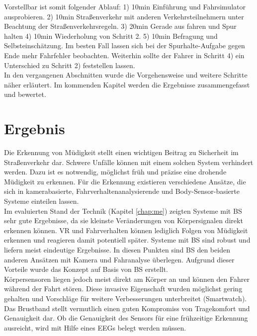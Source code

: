 {Vorstellbar ist somit folgender Ablauf: 1) 10min Einführung und Fahrsimulator ausprobieren. 2) 10min Straßenverkehr mit anderen Verkehrsteilnehmern unter Beachtung der Straßenverkehrsregeln. 3) 20min Gerade aus fahren und Spur halten 4) 10min Wiederholung von Schritt 2. 5) 10min Befragung und Selbsteinschätzung.
Im besten Fall lassen sich bei der Spurhalte-Aufgabe gegen Ende mehr Fahrfehler beobachten. Weiterhin sollte der Fahrer in Schritt 4) ein Unterschied zu Schritt 2) feststellen lassen.\\

In den vergangenen Abschnitten wurde die Vorgehensweise und weitere Schritte näher erläutert. Im kommenden Kapitel werden die Ergebnisse zusammengefasst und bewertet.


\section{Ergebnis}
\label{chap:result}
Die Erkennung von Müdigkeit stellt einen wichtigen Beitrag zu Sicherheit im Straßenverkehr dar. Schwere Unfälle können mit einem solchen System verhindert werden. Dazu ist es notwendig, möglichst früh und präzise eine drohende Müdigkeit zu erkennen. Für die Erkennung existieren verschiedene Ansätze, die sich in kamerabasierte, Fahrverhaltenanalysierende und Body-Sensor-basierte Systeme einteilen lassen. \\

Im evaluierten Stand der Technik (Kapitel \ref{chap:me}) zeigten Systeme mit \acl{BS}  sehr gute Ergebnisse, da sie kleinste Veränderungen von Körpersignalen direkt erkennen können. VR und Fahrverhalten können lediglich Folgen von Müdigkeit erkennen und reagieren damit potentiell später. Systeme mit \acl{BS} sind robust und liefern meist eindeutige Ergebnisse. In diesen Punkten sind \acl{BS} den beiden anderen Ansätzen mit Kamera und Fahranalyse überlegen. Aufgrund dieser Vorteile wurde das Konzept auf Basis von \acl{BS} erstellt. \\

Körpersensoren liegen jedoch meist direkt am Körper an und können den Fahrer während der Fahrt stören. Diese invasive Eigenschaft wurden möglichst gering gehalten und Vorschläge für weitere Verbesserungen unterbreitet (Smartwatch). Das Brustband stellt vermutlich einen guten Kompromiss von Tragekomfort und Genauigkeit dar. Ob die Genauigkeit des Sensors für eine frühzeitige Erkennung ausreicht, wird mit Hilfe eines EEGs belegt werden müssen. \\

}
